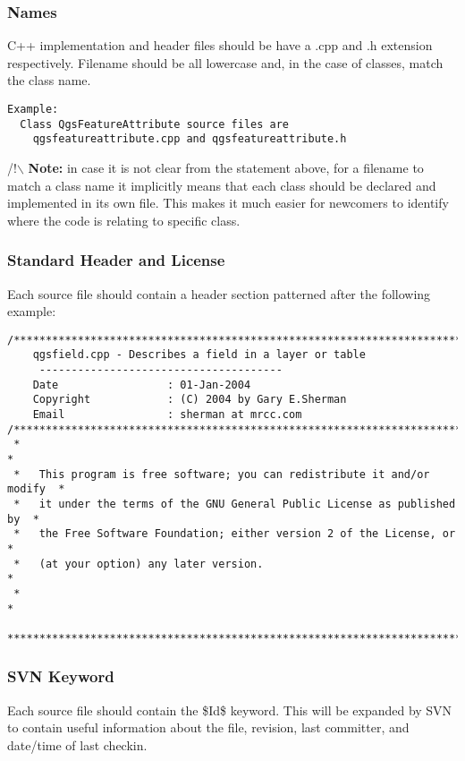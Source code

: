 \subsubsection{Names}
C++ implementation and header files should be have a .cpp and .h extension
respectively.  Filename should be all lowercase and, in the case of classes,
match the class name.

\begin{verbatim}
Example:
  Class QgsFeatureAttribute source files are 
    qgsfeatureattribute.cpp and qgsfeatureattribute.h
\end{verbatim}

/!$\backslash$ \textbf{Note:} in case it is not clear from the statement above, for a filename 
to match a class name it implicitly means that each class should be declared 
and implemented in its own file. This makes it much easier for newcomers to 
identify where the code is relating to specific class.

\hypertarget{toc12}{}
\subsubsection{Standard Header and License}
Each source file should contain a header section patterned after the following
example:

\begin{verbatim}
/***************************************************************************
    qgsfield.cpp - Describes a field in a layer or table
     --------------------------------------
    Date                 : 01-Jan-2004
    Copyright            : (C) 2004 by Gary E.Sherman
    Email                : sherman at mrcc.com
/***************************************************************************
 *                                                                         *
 *   This program is free software; you can redistribute it and/or modify  *
 *   it under the terms of the GNU General Public License as published by  *
 *   the Free Software Foundation; either version 2 of the License, or     *
 *   (at your option) any later version.                                   *
 *                                                                         *
 ***************************************************************************/
\end{verbatim}

\hypertarget{toc13}{}
\subsubsection{SVN Keyword}
Each source file should contain the \$Id\$ keyword. This will be expanded by SVN
to contain useful information about the file, revision, last committer, and
date/time of last checkin.

